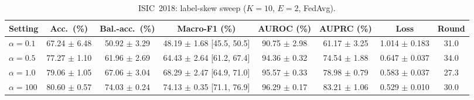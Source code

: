 \begin{table}[!t]
\caption{ISIC~2018: label-skew sweep ($K{=}10$, $E{=}2$, FedAvg).}
\label{tab:18-partition}
\centering
\footnotesize
\begin{tabular}{lccccccc}
\toprule
Setting & Acc.\ (\%) & Bal.-acc.\ (\%) & Macro-F1 (\%) & AUROC (\%) & AUPRC (\%) & Loss & Round \\
\midrule
$\alpha=0.1$ & 67.24 $\pm$ 6.48 & 50.92 $\pm$ 3.29 & 48.19 $\pm$ 1.68 [45.5, 50.5] & 90.75 $\pm$ 2.98 & 61.17 $\pm$ 3.25 & 1.014 $\pm$ 0.183 & 31.0 \\
$\alpha=0.5$ & 77.27 $\pm$ 1.10 & 61.96 $\pm$ 2.69 & 64.43 $\pm$ 2.64 [61.2, 67.4] & 94.36 $\pm$ 0.32 & 74.54 $\pm$ 1.88 & 0.647 $\pm$ 0.037 & 34.0 \\
$\alpha=1.0$ & 79.06 $\pm$ 1.05 & 67.06 $\pm$ 3.04 & 68.29 $\pm$ 2.47 [64.9, 71.0] & 95.57 $\pm$ 0.33 & 78.98 $\pm$ 0.79 & 0.583 $\pm$ 0.037 & 27.3 \\
$\alpha=100$ & 80.60 $\pm$ 0.57 & 74.03 $\pm$ 0.24 & 74.13 $\pm$ 0.35 [71.1, 76.9] & 96.29 $\pm$ 0.17 & 83.21 $\pm$ 1.06 & 0.529 $\pm$ 0.010 & 30.0 \\
\bottomrule
\end{tabular}
\end{table}